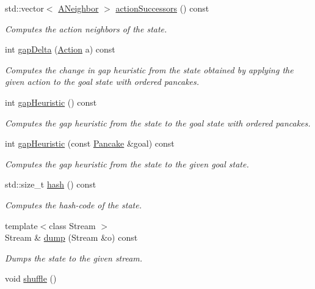 \begin{DoxyCompactItemize}
std\+::vector$<$ \hyperlink{structslb_1_1ext_1_1domain_1_1pancake_1_1Pancake_ac0096c15d7fe3415ecba0d6240510468}{A\+Neighbor} $>$ \hyperlink{structslb_1_1ext_1_1domain_1_1pancake_1_1Pancake_a7d57be3ecd82a36f90ac6e2e7a4b5033}{action\+Successors} () const 
\begin{DoxyCompactList}\small\item\em Computes the action neighbors of the state. \end{DoxyCompactList}\item 
int \hyperlink{structslb_1_1ext_1_1domain_1_1pancake_1_1Pancake_adb511c15300fda734ee57c3560b8d60d}{gap\+Delta} (\hyperlink{structslb_1_1ext_1_1domain_1_1pancake_1_1Pancake_aee972b60eec5485f6f53aabf5bcb4498}{Action} a) const 
\begin{DoxyCompactList}\small\item\em Computes the change in gap heuristic from the state obtained by applying the given action to the goal state with ordered pancakes. \end{DoxyCompactList}\item 
int \hyperlink{structslb_1_1ext_1_1domain_1_1pancake_1_1Pancake_a3509d1848a227e75aa5530d5ca5157cf}{gap\+Heuristic} () const 
\begin{DoxyCompactList}\small\item\em Computes the gap heuristic from the state to the goal state with ordered pancakes. \end{DoxyCompactList}\item 
int \hyperlink{structslb_1_1ext_1_1domain_1_1pancake_1_1Pancake_a7e69a9723409cdc3b1a1d6cfc53f1105}{gap\+Heuristic} (const \hyperlink{structslb_1_1ext_1_1domain_1_1pancake_1_1Pancake}{Pancake} \&goal) const 
\begin{DoxyCompactList}\small\item\em Computes the gap heuristic from the state to the given goal state. \end{DoxyCompactList}\item 
std\+::size\+\_\+t \hyperlink{structslb_1_1ext_1_1domain_1_1pancake_1_1Pancake_ae78163023eee0513b2d3bebad253392d}{hash} () const 
\begin{DoxyCompactList}\small\item\em Computes the hash-\/code of the state. \end{DoxyCompactList}\item 
{\footnotesize template$<$class Stream $>$ }\\Stream \& \hyperlink{structslb_1_1ext_1_1domain_1_1pancake_1_1Pancake_a051efa91aeccf905538b2efb44363cce}{dump} (Stream \&o) const 
\begin{DoxyCompactList}\small\item\em Dumps the state to the given stream. \end{DoxyCompactList}\item 
void \hyperlink{structslb_1_1ext_1_1domain_1_1pancake_1_1Pancake_adc3c307c4c7749cf52adbd24c6ed5e65}{shuffle} ()\hypertarget{structslb_1_1ext_1_1domain_1_1pancake_1_1Pancake_adc3c307c4c7749cf52adbd24c6ed5e65}{}\label{structslb_1_1ext_1_1domain_1_1pancake_1_1Pancake_adc3c307c4c7749cf52adbd24c6ed5e65}


\end{DoxyCompactItemize}
